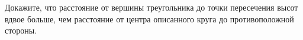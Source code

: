 \begin{ex}
	\begin{condition}
		Докажите, что расстояние от вершины треугольника до точки пересечения высот вдвое больше, чем расстояние от	центра описанного круга до противоположной стороны.
	\end{condition}
\end{ex}